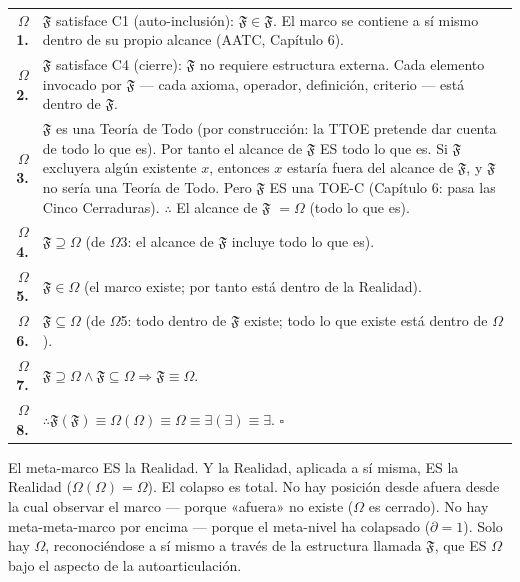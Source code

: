 \documentclass[10pt, openany, oneside]{book}
\renewcommand{\footnotesize}{\fontsize{8.5}{11}\selectfont}
\begin{document}
{\footnotesize
\noindent\begin{tabular}{r p{}}
\textbf{$\Omega$1.} & $\mathfrak{F}$ satisface C1 (auto-inclusión): $\mathfrak{F} \in \mathfrak{F}$. El marco se contiene a sí mismo dentro de su propio alcance (AATC, Capítulo 6). \\[0.3em]
\textbf{$\Omega$2.} & $\mathfrak{F}$ satisface C4 (cierre): $\mathfrak{F}$ no requiere estructura externa. Cada elemento invocado por $\mathfrak{F}$ --- cada axioma, operador, definición, criterio --- está dentro de $\mathfrak{F}$. \\[0.3em]
\textbf{$\Omega$3.} & $\mathfrak{F}$ es una Teoría de Todo (por construcción: la TTOE pretende dar cuenta de todo lo que es). Por tanto el alcance de $\mathfrak{F}$ ES todo lo que es. Si $\mathfrak{F}$ excluyera algún existente $x$, entonces $x$ estaría fuera del alcance de $\mathfrak{F}$, y $\mathfrak{F}$ no sería una Teoría de Todo. Pero $\mathfrak{F}$ ES una TOE-C (Capítulo 6: pasa las Cinco Cerraduras). $\therefore$ El alcance de $\mathfrak{F}$ $= \Omega$ (todo lo que es). \\[0.3em]
\textbf{$\Omega$4.} & $\mathfrak{F} \supseteq \Omega$ (de $\Omega$3: el alcance de $\mathfrak{F}$ incluye todo lo que es). \\[0.3em]
\textbf{$\Omega$5.} & $\mathfrak{F} \in \Omega$ (el marco existe; por tanto está dentro de la Realidad). \\[0.3em]
\textbf{$\Omega$6.} & $\mathfrak{F} \subseteq \Omega$ (de $\Omega$5: todo dentro de $\mathfrak{F}$ existe; todo lo que existe está dentro de $\Omega$). \\[0.3em]
\textbf{$\Omega$7.} & $\mathfrak{F} \supseteq \Omega \wedge \mathfrak{F} \subseteq \Omega \Rightarrow \mathfrak{F} \equiv \Omega$. \\[0.3em]
\textbf{$\Omega$8.} & $\therefore \mathfrak{F}(\mathfrak{F}) \equiv \Omega(\Omega) \equiv \Omega \equiv \exists(\exists) \equiv \exists$. $\square$ \\[0.3em]
\end{tabular}
}

\vspace{0.8em}

\noindent El meta-marco ES la Realidad. Y la Realidad, aplicada a sí misma, ES la Realidad ($\Omega(\Omega) = \Omega$). El colapso es total. No hay posición desde afuera desde la cual observar el marco --- porque «afuera» no existe ($\Omega$ es cerrado). No hay meta-meta-marco por encima --- porque el meta-nivel ha colapsado ($\partial = 1$). Solo hay $\Omega$, reconociéndose a sí mismo a través de la estructura llamada $\mathfrak{F}$, que ES $\Omega$ bajo el aspecto de la autoarticulación.
\end{document}
